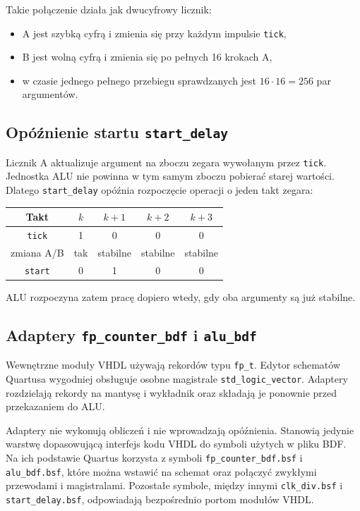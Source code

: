\documentclass[12pt,a4paper]{article}
\begin{document}
Takie połączenie działa jak dwucyfrowy licznik:

\begin{itemize}
    \item A jest szybką cyfrą i zmienia się przy każdym impulsie
          \texttt{tick},
    \item B jest wolną cyfrą i zmienia się po pełnych 16 krokach A,
    \item w czasie jednego pełnego przebiegu sprawdzanych jest
          \(16 \cdot 16 = 256\) par argumentów.
\end{itemize}

\subsection{Opóźnienie startu \texttt{start\_delay}}

Licznik A aktualizuje argument na zboczu zegara wywołanym przez
\texttt{tick}. Jednostka ALU nie powinna w tym samym zboczu pobierać starej
wartości. Dlatego \texttt{start\_delay} opóźnia rozpoczęcie operacji o jeden
takt zegara:

\begin{center}
\begin{tabular}{c|cccc}
    Takt & \(k\) & \(k+1\) & \(k+2\) & \(k+3\) \\
    \hline
    \texttt{tick} & 1 & 0 & 0 & 0 \\
    zmiana A/B & tak & stabilne & stabilne & stabilne \\
    \texttt{start} & 0 & 1 & 0 & 0 \\
\end{tabular}
\end{center}

ALU rozpoczyna zatem pracę dopiero wtedy, gdy oba argumenty są już stabilne.

\subsection{Adaptery \texttt{fp\_counter\_bdf} i \texttt{alu\_bdf}}

Wewnętrzne moduły VHDL używają rekordów typu \texttt{fp\_t}. Edytor
schematów Quartusa wygodniej obsługuje osobne magistrale
\texttt{std\_logic\_vector}. Adaptery rozdzielają rekordy na mantysę
i wykładnik oraz składają je ponownie przed przekazaniem do ALU.

Adaptery nie wykonują obliczeń i nie wprowadzają opóźnienia. Stanowią jedynie
warstwę dopasowującą interfejs kodu VHDL do symboli użytych w pliku BDF.
Na ich podstawie Quartus korzysta z symboli
\texttt{fp\_counter\_bdf.bsf} i \texttt{alu\_bdf.bsf}, które można wstawić
na schemat oraz połączyć zwykłymi przewodami i magistralami. Pozostałe
symbole, między innymi \texttt{clk\_div.bsf} i
\texttt{start\_delay.bsf}, odpowiadają bezpośrednio portom modułów VHDL.
\end{document}
